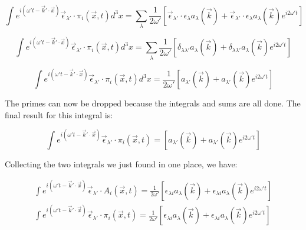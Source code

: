 \documentclass[a4]{article}
\begin{document}
    \begin{equation} %
        \int e^{i (\omega' t - \vec{k}' \cdot \vec{x})} \vec{\epsilon}_{\lambda'} \cdot \pi_{i} (\vec{x}, t) d^3 x = \sum_{\lambda} \frac{1}{2 \omega'} [\vec{\epsilon}_{\lambda'} \cdot \epsilon_{\lambda} a_{\lambda} (\vec{k}) + \vec{\epsilon}_{\lambda'} \cdot \epsilon_{\lambda} a_{\lambda} (\vec{k}) e^{i2 \omega' t}]
    \end{equation}

    \begin{equation} %
        \int e^{i (\omega' t - \vec{k}' \cdot \vec{x})} \vec{\epsilon}_{\lambda'} \cdot \pi_{i} (\vec{x}, t) d^3 x = \sum_{\lambda} \frac{1}{2 \omega'} [\delta_{\lambda \lambda'} a_{\lambda} (\vec{k}) + \delta_{\lambda \lambda'} a_{\lambda} (\vec{k}) e^{i2 \omega' t}]
    \end{equation}

    \begin{equation} %
        \int e^{i (\omega' t - \vec{k}' \cdot \vec{x})} \vec{\epsilon}_{\lambda'} \cdot \pi_{i} (\vec{x}, t) d^3 x = \frac{1}{2 \omega'} [a_{\lambda'} (\vec{k}) + a_{\lambda'} (\vec{k}) e^{i2 \omega' t}]
    \end{equation}

    The primes can now be dropped because the integrals and sums are all done. The final result for this integral is:

    \begin{framed}
        \begin{equation}
            \int e^{i (\omega' t - \vec{k}' \cdot \vec{x})} \vec{\epsilon}_{\lambda'} \cdot \pi_{i} (\vec{x}, t) = [a_{\lambda'} (\vec{k}) + a_{\lambda'} (\vec{k}) e^{i 2 \omega' t}]
        \end{equation}
    \end{framed}

    Collecting the two integrals we just found in one place, we have:

    \begin{framed}
        \begin{equation}
            \begin{aligned}
                \int e^{i (\omega' t - \vec{k}' \cdot \vec{x})} \vec{\epsilon}_{\lambda'} \cdot A_{i} (\vec{x}, t) = \frac{1}{2 \omega'} [\epsilon_{\lambda i} a_{\lambda} (\vec{k}) + \epsilon_{\lambda i} a_{\lambda} (\vec{k}) e^{i2 \omega' t}] \\
                \int e^{i (\omega' t - \vec{k}' \cdot \vec{x})} \vec{\epsilon}_{\lambda'} \cdot \pi_{i} (\vec{x}, t) = \frac{1}{2 \omega'} [\epsilon_{\lambda i} a_{\lambda} (\vec{k}) + \epsilon_{\lambda i} a_{\lambda} (\vec{k}) e^{i2 \omega' t}]
            \end{aligned}
        \end{equation}
    \end{framed}
\end{document}
